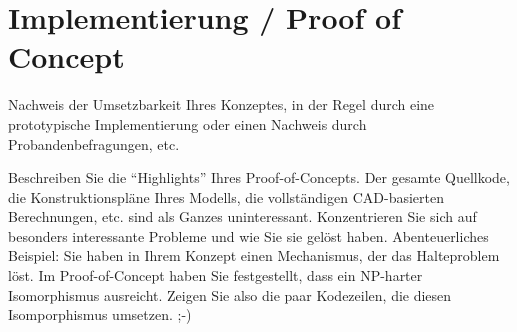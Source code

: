 \chapter{Implementierung / Proof of Concept}\label{chap:ProofOfConcept}
Nachweis der Umsetzbarkeit Ihres Konzeptes, in der Regel durch eine prototypische Implementierung oder einen Nachweis durch Probandenbefragungen, etc.

Beschreiben Sie die \enquote{Highlights} Ihres Proof-of-Concepts. Der gesamte Quellkode, die Konstruktionspläne Ihres Modells, die vollständigen CAD-basierten Berechnungen, etc. sind als Ganzes uninteressant. Konzentrieren Sie sich auf besonders interessante Probleme und wie Sie sie gelöst haben. Abenteuerliches Beispiel: Sie haben in Ihrem Konzept einen Mechanismus, der das Halteproblem löst. Im Proof-of-Concept haben Sie festgestellt, dass ein NP-harter Isomorphismus ausreicht. Zeigen Sie also die paar Kodezeilen, die diesen Isomporphismus umsetzen. ;-)

